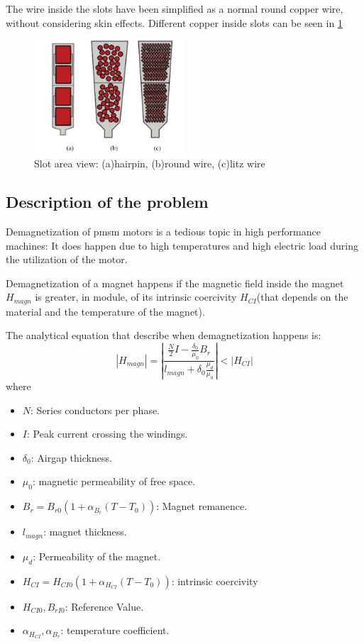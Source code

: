 The wire inside the slots have been simplified as a normal round copper wire, without considering skin effects. Different copper inside slots can be seen in \cref{fig:copper_example}
\begin{figure}[H]
    \centering
    \includegraphics[width=0.5\textwidth]{sections/images/section1/copper_example.png}
    \caption{Slot area view: (a)hairpin, (b)round wire, (c)litz wire}
    \label{fig:copper_example}
\end{figure}
\subsection{Description of the problem}
Demagnetization of \gls{pmsm} motors is a tedious topic in high performance machines: It does happen due to high temperatures and high electric load during the utilization of the motor.

Demagnetization of a magnet happens if the magnetic field inside the magnet $H_{magn}$ is greater, in module, of its intrinsic coercivity $H_{CI}$(that depends on the material and the temperature of the magnet).

The analytical equation that describe when demagnetization happens is:
\begin{equation}\label{eq:demagn_formula_approx}
    |H_{magn}| = \left|\frac{\frac{N}{2}I-\frac{\delta_0}{\mu_0}B_r}{l_{magn}+\delta_0\frac{\mu_d}{\mu_0}}\right|<|H_{CI}|
\end{equation}
where
\begin{itemize}
    \item $N$: Series conductors per phase.
    \item $I$: Peak current crossing the windings.
    \item $\delta_0$: Airgap thickness.
    \item $\mu_0$: magnetic permeability of free space.
    \item $B_r=B_{r0}(1+\alpha_{B_{r}}(T-T_0))$: Magnet remanence.
    \item $l_{magn}$: magnet thickness.
    \item $\mu_d$: Permeability of the magnet.
    \item $H_{CI}=H_{CI0}(1+\alpha_{H_{CI}}(T-T_0))$: intrinsic coercivity
    \item $H_{CI0},B_{rI0}$: Reference Value.
    \item $\alpha_{H_{CI}}, \alpha_{B_{r}}$: temperature coefficient.
\end{itemize}

